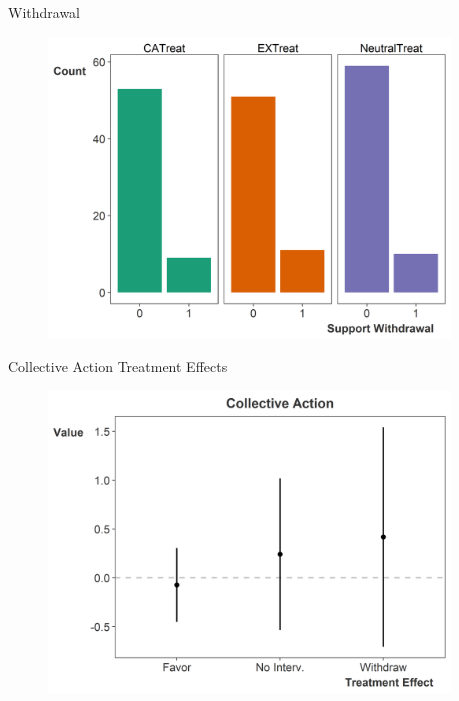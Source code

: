 \documentclass[12pt]{beamer}
\begin{document}


\begin{frame}{Withdrawal}

\begin{figure}[htbp]
	\centering
		\includegraphics[width=0.95\textwidth]{raw-withdraw.png}
\end{figure}


\end{frame}




\begin{frame}{Collective Action Treatment Effects}

\begin{figure}[htbp]
	\centering
		\includegraphics[width=0.95\textwidth]{ca-treat.png}
\end{figure}


\end{frame}
\end{document}
